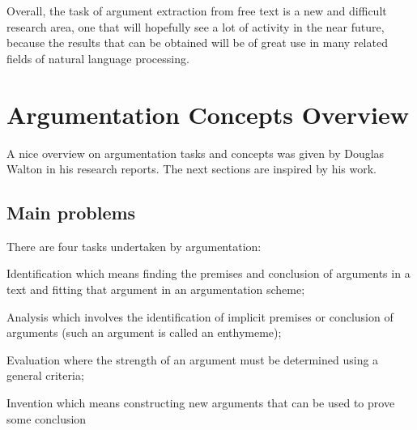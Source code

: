 \par
Overall, the task of argument extraction from free text is a new and difficult research area, one that will hopefully see a lot of activity in the near future, because the results that can be obtained will be of great use in many related fields of natural language processing.

\section{Argumentation Concepts Overview}
\par A nice overview on argumentation tasks and concepts was given by Douglas Walton in his research reports\cite{ara1}. The next sections are inspired by his work.

\subsection{Main problems}
\par
There are four tasks undertaken by argumentation:
\begin{description}
\item Identification which means finding the premises and conclusion of arguments in a text and fitting that argument in an argumentation scheme;
\item Analysis which involves the identification of implicit premises or conclusion of arguments (such an argument is called an enthymeme);
\item Evaluation where the strength of an argument must be determined using a general criteria;
\item Invention which means constructing new arguments that can be used to prove some conclusion
\end{description}


